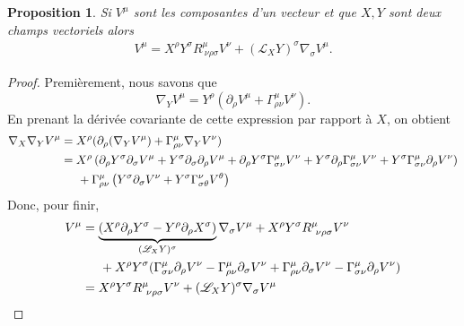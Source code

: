 \documentclass[a4paper,11pt]{report}
\theoremstyle{definition}
\theoremstyle{plain}
\newtheorem{prop}[thm]{Proposition}
\theoremstyle{definition}
\theoremstyle{remark}
\renewcommand{\L}{\mathscr{L}}
\newcommand{\p}{\partial}
\begin{document}
            \begin{prop}
                Si $V^\mu$ sont les composantes d'un vecteur et que $X,Y$ sont deux champs vectoriels alors
                \begin{align}
                    [\nabla_X,\nabla_Y]V^\mu = X^\rho Y^\sigma R^{\mu}_{~\nu\rho\sigma}V^\nu + (\L_X Y)^\sigma\nabla_\sigma V^\mu.
                \end{align}
            \end{prop}
            
            \begin{proof}
                Premièrement, nous savons que
                \begin{equation}
                    \nabla_Y V^\mu = Y^\rho(\p_\rho V^\mu+\Gamma^\mu_{\rho\nu}V^\nu).
                \end{equation}
                En prenant la dérivée covariante de cette expression par rapport à $X$, on obtient
                \begin{align}
                    \nabla_X \nabla_Y V^\mu &= X^\rho(\p_\rho (\nabla_Y V^\mu)+\Gamma^\mu_{\rho\nu}\nabla_Y V^\nu)\\
                    &= X^\rho \left( \p_\rho Y^\sigma\p_\sigma V^\mu+Y^\sigma\p_\sigma\p_\rho V^\mu + \p_\rho Y^\sigma \Gamma^\mu_{\sigma\nu} V^\nu + Y^\sigma\p_\rho\Gamma^\mu_{\sigma\nu} V^\nu +Y^\sigma \Gamma^\mu_{\sigma\nu}\p_\rho V^\nu \right)\\
                    &\hspace{0.5cm}+\Gamma^\mu_{\rho\nu}\left( Y^\sigma\p_\sigma V^\nu + Y^\sigma \Gamma^\nu_{\sigma\theta} V^\theta \right)
                \end{align}
                Donc, pour finir,
                \begin{align}
                    [\nabla_X,\nabla_Y]V^\mu &= \underbrace{(X^\rho\p_\rho Y^\sigma-Y^\rho\p_\rho X^\sigma)}_{(\L_XY)^\sigma}\nabla_\sigma V^\mu+ X^\rho Y^\sigma R^\mu_{~\nu\rho\sigma} V^\nu\\
                    &\hspace{0.5cm}+ X^\rho Y^\sigma (\Gamma^\mu_{\sigma\nu}\p_\rho V^\nu-\Gamma^\mu_{\rho\nu}\p_\sigma V^\nu + \Gamma^\mu_{\rho\nu}\p_\sigma V^\nu-\Gamma^\mu_{\sigma\nu}\p_\rho V^\nu )\\
                    &= X^\rho Y^\sigma R^{\mu}_{~\nu\rho\sigma}V^\nu + (\L_X Y)^\sigma\nabla_\sigma V^\mu
                \end{align}
            \end{proof}
            
\end{document}
